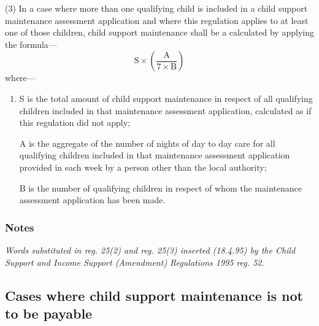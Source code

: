 \documentclass[a4paper]{article}
\newcommand\amendment[1]{\subsubsection*{Notes}{\itshape\frenchspacing\footnotesize #1 \par\goodbreak}}
\begin{document}
(3) In a case where more than one qualifying child is included in a child support maintenance assessment application and where this regulation applies to at least one of those children, child support maintenance shall be a calculated by applying the formula—
\[ \mathrm{S} \times \left( \frac{\mathrm{A}}{7 \times \mathrm{B}} \right)  \]
where—
\begin{enumerate}\item[]
S is the total amount of child support maintenance in respect of all qualifying children included in that maintenance assessment application, calculated as if this regulation did not apply;

A is the aggregate of the number of nights of day to day care for all qualifying children included in that maintenance assessment application provided in each week by a person other than the local authority;

B is the number of qualifying children in respect of whom the maintenance assessment application has been made.
\end{enumerate}

\amendment{
Words substituted in reg. 25(2) and reg. 25(3) inserted (18.4.95) by the Child Support and Income Support (Amendment) Regulations 1995 reg. 52.
}

\subsection[26. Cases where child support maintenance is not to be payable]{Cases where child support maintenance is not to be payable}
\end{document}
